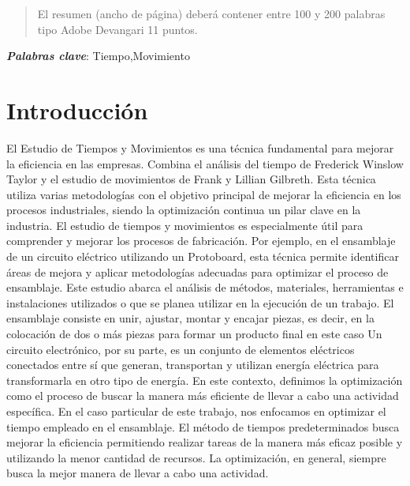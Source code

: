     \maketitle
    \thispagestyle{fancy}
    
    
    
    \begin{abstract}
    \noindent 
    El resumen (ancho de página) deberá contener entre 100 y 200 palabras tipo Adobe Devangari 11 puntos.
    
    \end{abstract}
    \textbf{\textit{Palabras clave}}:
    Tiempo,Movimiento
          
    
    \section{Introducción}
    El Estudio de Tiempos y Movimientos es una técnica fundamental para mejorar la eficiencia en las empresas. Combina el análisis del tiempo de Frederick Winslow Taylor y el estudio de movimientos de Frank y Lillian Gilbreth. Esta técnica utiliza varias metodologías con el objetivo principal de mejorar la eficiencia en los procesos industriales, siendo la optimización continua un pilar clave en la industria.
    El estudio de tiempos y movimientos es especialmente útil para comprender y mejorar los procesos de fabricación. Por ejemplo, en el ensamblaje de un circuito eléctrico utilizando un Protoboard, esta técnica permite identificar áreas de mejora y aplicar metodologías adecuadas para optimizar el proceso de ensamblaje.
    Este estudio abarca el análisis de métodos, materiales, herramientas e instalaciones utilizados o que se planea utilizar en la ejecución de un trabajo. El ensamblaje consiste en unir, ajustar, montar y encajar piezas, es decir, en la colocación de dos o más piezas para formar un producto final en este caso Un circuito electrónico, por su parte, es un conjunto de elementos eléctricos conectados entre sí que generan, transportan y utilizan energía eléctrica para transformarla en otro tipo de energía. En este contexto, definimos la optimización como el proceso de buscar la manera más eficiente de llevar a cabo una actividad específica. En el caso particular de este trabajo, nos enfocamos en optimizar el tiempo empleado en el ensamblaje. \cite{RAE}
    El método de tiempos predeterminados busca mejorar la eficiencia permitiendo realizar tareas de la manera más eficaz posible y utilizando la menor cantidad de recursos. La optimización, en general, siempre busca la mejor manera de llevar a cabo una actividad.
    \cite{RAE}
